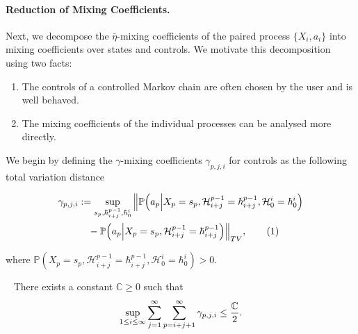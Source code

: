 \documentclass[opre,sglanonrev]{informs4}
\numberwithin{equation}{section}
\newcommand{\lp}{\left(}
\newcommand{\rp}{\right)}
\newcommand{\History}{\mathcal{H}}
\newcommand{\history}{\hbar}
\newcommand{\Cbb}{\mathbb{C}}
\newcommand{\Pbb}{\mathbb{P}}
\newcommand{\constant}{\Cbb}
\newcommand\numberthis{\addtocounter{equation}{1}\tag{\theequation}}
\newcommand{\prob}{\Pbb}
\newcommand{\probl}{\prob}
\begin{document}
{{ \paragraph{Reduction of Mixing Coefficients.} Next, we decompose the $\bar \eta$-mixing coefficients of the paired process $\{X_i,a_i\}$ into mixing coefficients over states and controls. 
 We motivate this decomposition using two facts:
\begin{enumerate}
    \item\label{fact:decomp-mot1} The controls of a controlled Markov chain are often chosen by the user and is well behaved.
    \item\label{fact:decomp-mot2} The mixing coefficients of the individual processes can be analysed more directly.
\end{enumerate}
We begin by defining the $\gamma$-mixing coefficients  $\gamma_{p,j,i}$ for controls as the following total variation distance 
\begin{small}
\begin{align*}
    \gamma_{p,j,i} &:= 
    \sup_{s_p, \history_{i+j}^{p-1}, \history_0^i} 
    \Big\lVert 
        \probl\Big( 
            a_p \Big| X_p = s_p, \History_{i+j}^{p-1} = \history_{i+j}^{p-1}, \History_0^i = \history_{0}^i
        \Big) \\
    &\quad - 
        \probl\Big( 
            a_p \Big| X_p = s_p, \History_{i+j}^{p-1} = \history_{i+j}^{p-1}
        \Big)
    \Big\rVert_{TV},
\numberthis\label{eq:def-gamma}
\end{align*}    
\end{small}
{%
where $\prob\lp X_p=s_p,\History_{i+j}^{p-1}=\history_{i+j}^{p-1},\History_0^i=\history_{0}^{i}\rp>0$.}
\begin{assumption}~\label{assume:control-mixing} There exists a constant $\constant\geq 0$ such that
\begin{align*}
    \sup_{1\leq i\leq{\color{black} \infty}}\sum_{j=1}^{{\color{black} \infty}} \sum_{p=i+j+1}^{{\color{black} \infty}} \gamma_{p,j,i}\leq \frac{\constant}{2}.
\end{align*}


\end{assumption}}}
\end{document}
